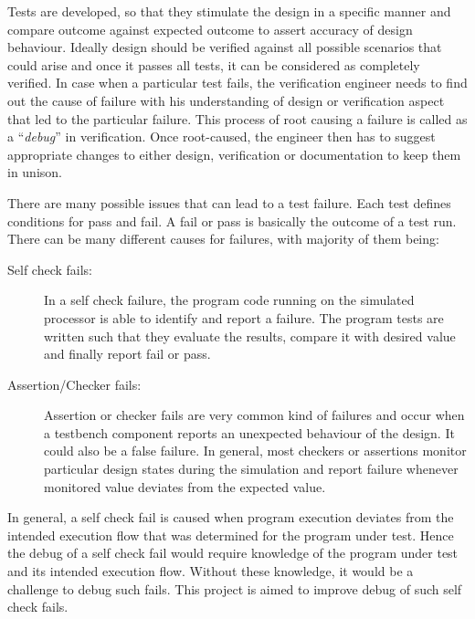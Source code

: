 Tests are developed, so that they stimulate the design in a specific manner and compare outcome against expected outcome to assert accuracy of design behaviour. Ideally design should be verified against all possible scenarios that could arise and once it passes all tests, it can be considered as completely verified. In case when a particular test fails, the verification engineer needs to find out the cause of failure with his understanding of design or verification aspect that led to the particular failure. This process of root causing a failure is called as a ``{\it debug}'' in verification. Once root-caused, the engineer then has to suggest appropriate changes to either design, verification or documentation to keep them in unison. 

There are many possible issues that can lead to a test failure. Each test defines conditions for pass and fail. A fail or pass is basically the outcome of a test run. There can be many different causes for failures, with majority of them being:

\begin{description}
	\item[Self check fails:] In a self check failure, the program code running on the simulated processor is able to identify and report a failure. The program tests are written such that they evaluate the results, compare it with desired value and finally report fail or pass. 
	\item[Assertion/Checker fails:] Assertion or checker fails are very common kind of failures and occur when a testbench component reports an unexpected behaviour of the design. It could also be a false failure. In general, most checkers or assertions monitor particular design states during the simulation and report failure whenever monitored value deviates from the expected value. 
\end{description}

In general, a self check fail is caused when program execution deviates from the intended execution flow that was determined for the program under test. Hence the debug of a self check fail would require knowledge of the program under test and its intended execution flow. Without these knowledge, it would be a challenge to debug such fails. This project is aimed to improve debug of such self check fails.

%
%
%

